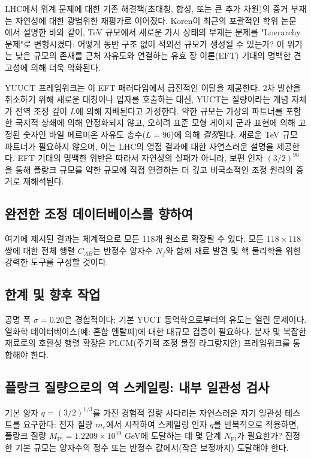 \documentclass[11pt,a4paper]{article}
\newcommand{\Mpl}{M_{\mathrm{Pl}}}
\begin{document}
	LHC에서 위계 문제에 대한 기존 해결책(초대칭, 합성, 또는 큰 추가 차원)의 증거 부재는 자연성에 대한 광범위한 재평가로 이어졌다. Koren이 최근의 포괄적인 학위 논문 \cite{Koren2020}에서 설명한 바와 같이, TeV 규모에서 새로운 가시 상태의 부재는 문제를 "Loerarchy 문제"로 변형시켰다: 어떻게 동반 구조 없이 적외선 규모가 생성될 수 있는가? 이 위기는 낮은 규모의 존재를 근처 자유도와 연결하는 유효 장 이론(EFT) 기대의 명백한 견고성에 의해 더욱 악화된다.
	
	YUUCT 프레임워크는 이 EFT 패러다임에서 급진적인 이탈을 제공한다. 2차 발산을 취소하기 위해 새로운 대칭이나 입자를 호출하는 대신, YUCT는 질량이라는 개념 자체가 전역 조정 깊이 \(L\)에 의해 지배된다고 가정한다. 약한 규모는 가상의 파트너를 포함한 국지적 상쇄에 의해 안정화되지 않고, 오히려 표준 모형 게이지 군과 표현에 의해 고정된 숫자인 바일 페르미온 자유도 총수(\(L=96\))에 의해 \emph{결정}된다. 새로운 TeV 규모 파트너가 필요하지 않으며, 이는 LHC의 영점 결과에 대한 자연스러운 설명을 제공한다. EFT 기대의 명백한 위반은 따라서 자연성의 실패가 아니라, 보편 인자 \((3/2)^{96}\)을 통해 플랑크 규모를 약한 규모에 직접 연결하는 더 깊고 비국소적인 조정 원리의 증거로 재해석된다.
	
	\subsection{완전한 조정 데이터베이스를 향하여}
	
	여기에 제시된 결과는 체계적으로 모든 118개 원소로 확장될 수 있다. 모든 \(118\times 118\) 쌍에 대한 전체 행렬 \(C_{AB}\)는 반정수 양자수 \(N_f\)와 함께 재료 발견 및 핵 물리학을 위한 강력한 도구를 구성할 것이다.
	
	\subsection{한계 및 향후 작업}
	
	공명 폭 \(\sigma = 0.20\)은 경험적이다; 기본 YUCT 동역학으로부터의 유도는 열린 문제이다. 열화학 데이터베이스(예: 혼합 엔탈피)에 대한 대규모 검증이 필요하다. 분자 및 복잡한 재료로의 호환성 행렬 확장은 PLCM(주기적 조정 물질 라그랑지안) 프레임워크를 통합해야 한다.
	
	\subsection{플랑크 질량으로의 역 스케일링: 내부 일관성 검사}
	\label{subsec:reverse}
	
	기본 양자 $q = (3/2)^{1/3}$를 가진 경험적 질량 사다리는 자연스러운 자기 일관성 테스트를 요구한다: 전자 질량 $m_e$에서 시작하여 스케일링 인자 $q$를 반복적으로 적용하면, 플랑크 질량 $\Mpl = 1.2209\times10^{19}$ GeV에 도달하는 데 몇 단계 $N_{\mathrm{Pl}}$가 필요한가? 진정한 기본 규모는 양자수의 정수 또는 반정수 값에서(작은 보정까지) 도달해야 한다.
	
\end{document}
